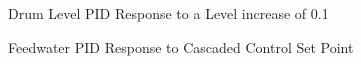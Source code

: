     \begin{figure}[ht]
        \begin{center}
            \caption{Drum Level PID Response to a Level increase of 0.1}
            \label{fig:PID_Level_LvlStep}
        \end{center}
    \end{figure}   %
    \begin{figure}[ht]
        \begin{center}
            \caption{Feedwater PID Response to Cascaded Control Set Point}
            \label{fig:PID_Feedwater_LvlStep}
        \end{center}
    \end{figure}   %
